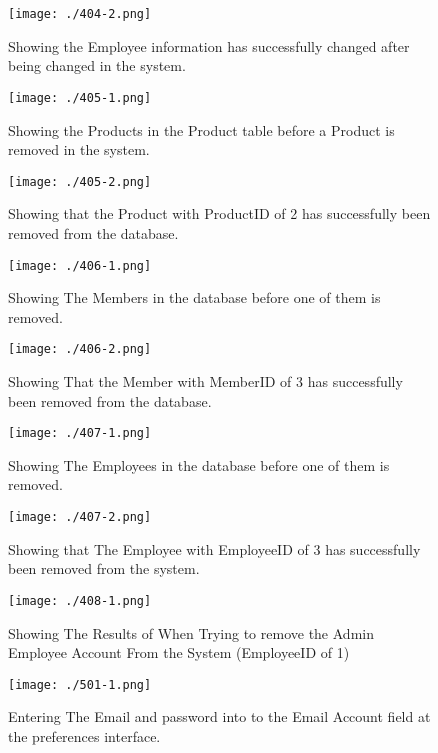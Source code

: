 \begin{figure}[H]
    \texttt{[image: ./404-2.png]}
    \caption{Showing the Employee information has successfully changed after being changed in the system.} \label{fig:404-2}
\end{figure}

\begin{figure}[H]
    \texttt{[image: ./405-1.png]}
    \caption{Showing the Products in the Product table before a Product is removed in the system.} \label{fig:405-1}
\end{figure}

\begin{figure}[H]
    \texttt{[image: ./405-2.png]}
    \caption{Showing that the Product with ProductID of 2 has successfully been removed from the database.} \label{fig:405-2}
\end{figure}

\begin{figure}[H]
    \texttt{[image: ./406-1.png]}
    \caption{Showing The Members in the database before one of them is removed.} \label{fig:406-1}
\end{figure}

\begin{figure}[H]
    \texttt{[image: ./406-2.png]}
    \caption{Showing That the Member with MemberID of 3 has successfully been removed from the database.} \label{fig:406-2}
\end{figure}

\begin{figure}[H]
    \texttt{[image: ./407-1.png]}
    \caption{Showing The Employees in the database before one of them is removed.} \label{fig:407-1}
\end{figure}

\begin{figure}[H]
    \texttt{[image: ./407-2.png]}
    \caption{Showing that The Employee with EmployeeID of 3 has successfully been removed from the system.} \label{fig:407-2}
\end{figure}

\begin{figure}[H]
    \texttt{[image: ./408-1.png]}
    \caption{Showing The Results of When Trying to remove the Admin Employee Account From the System (EmployeeID of 1)} \label{fig:408-1}
\end{figure}

\begin{figure}[H]
    \texttt{[image: ./501-1.png]}
    \caption{Entering The Email and password into to the Email Account field at the preferences interface.} \label{fig:501-1}
\end{figure}

